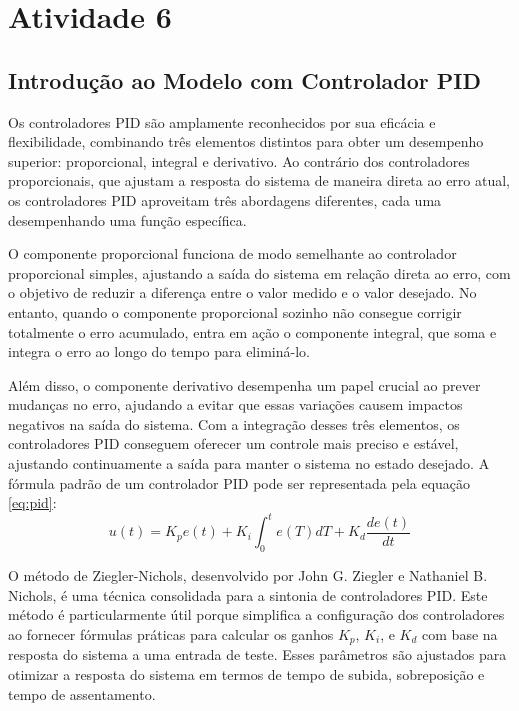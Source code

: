 
\section{Atividade 6}

\subsection{Introdução ao Modelo com Controlador PID}
Os controladores PID são amplamente reconhecidos por sua eficácia e flexibilidade, combinando três elementos distintos para obter um desempenho superior: proporcional, integral e derivativo. Ao contrário dos controladores proporcionais, que ajustam a resposta do sistema de maneira direta ao erro atual, os controladores PID aproveitam três abordagens diferentes, cada uma desempenhando uma função específica.

O componente proporcional funciona de modo semelhante ao controlador proporcional simples, ajustando a saída do sistema em relação direta ao erro, com o objetivo de reduzir a diferença entre o valor medido e o valor desejado. No entanto, quando o componente proporcional sozinho não consegue corrigir totalmente o erro acumulado, entra em ação o componente integral, que soma e integra o erro ao longo do tempo para eliminá-lo.

Além disso, o componente derivativo desempenha um papel crucial ao prever mudanças no erro, ajudando a evitar que essas variações causem impactos negativos na saída do sistema. Com a integração desses três elementos, os controladores PID conseguem oferecer um controle mais preciso e estável, ajustando continuamente a saída para manter o sistema no estado desejado.
A fórmula padrão de um controlador PID pode ser representada pela equação \ref{eq:pid}:
\begin{equation}
    u(t) = K_p e(t) + K_i \int_{0}^{t} e(T) dT + K_d \frac{d e(t)}{dt}
    \label{eq:pid}
\end{equation}

O método de Ziegler-Nichols, desenvolvido por John G. Ziegler e Nathaniel B. Nichols, é uma técnica consolidada para a sintonia de controladores PID. Este método é particularmente útil porque simplifica a configuração dos controladores ao fornecer fórmulas práticas para calcular os ganhos \( K_p \), \( K_i \), e \( K_d \) com base na resposta do sistema a uma entrada de teste. Esses parâmetros são ajustados para otimizar a resposta do sistema em termos de tempo de subida, sobreposição e tempo de assentamento.

